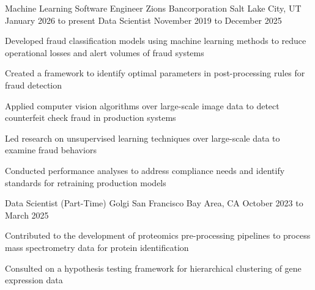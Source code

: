 

\begin{cventries}

  \cventry
    {Machine Learning Software Engineer} %
    {Zions Bancorporation} %
    {Salt Lake City, UT} %
    {January 2026 to present} %
    {}
  \vspace{-4.5mm}
  \cventry
    {Data Scientist} %
    {} %
    {} %
    {November 2019 to December 2025} %
    {
      \begin{cvitems} %
        \item {Developed fraud classification models using machine learning methods to reduce operational losses and alert volumes of fraud systems}
        \item {Created a framework to identify optimal parameters in post-processing rules for fraud detection}
        \item {Applied computer vision algorithms over large-scale image data to detect counterfeit check fraud in production systems}
        \item {Led research on unsupervised learning techniques over large-scale data to examine fraud behaviors}
        \item {Conducted performance analyses to address compliance needs and identify standards for retraining production models}
      \end{cvitems}
    }

  \cventry
    {Data Scientist (Part-Time) } %
    {Golgi} %
    {San Francisco Bay Area, CA} %
    {October 2023 to March 2025} %
    {
      \begin{cvitems} %
        \item {Contributed to the development of proteomics pre-processing pipelines to process mass spectrometry data for protein identification}
        \item {Consulted on a hypothesis testing framework for hierarchical clustering of gene expression data}
      \end{cvitems}
    }


\end{cventries}
